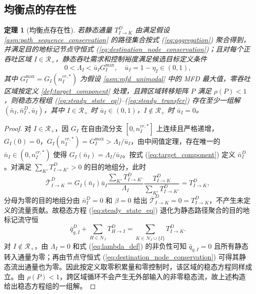 \documentclass[a4paper,12pt]{article}
\theoremstyle{plain}
\newtheorem{theorem}{定理}[section]
\theoremstyle{definition}
\theoremstyle{remark}
\begin{document}
\subsection{均衡点的存在性}

\begin{theorem}[均衡点存在性]\label{thm:equilibrium_existence}
若静态通量 $T_{I\to K}^D$ 由满足假设 \ref{asm:path_sequence_conservation} 的路径集合按式 (\ref{eq:aggregation}) 聚合得到，并满足目的地标记节点守恒式 (\ref{eq:destination_node_conservation})；且对每个正吞吐区域 $I \in \mathcal{R}_+$，静态吞吐需求和控制裕度满足候选目标定义条件
\begin{equation}\label{eq:margin_feasibility}
    0<\Lambda_I < \bar u_I G_I^{\max},
    \quad \bar u_I=1-\eta_I\in(0,1),
\end{equation}
其中 $G_I^{\max} = G_I(n_I^{cr,*})$ 为假设 \ref{asm:mfd_unimodal} 中的 MFD 最大值，零吞吐区域按定义 \ref{def:target_component} 处理，且跨区域转移矩阵 $P$ 满足 $\rho(P)<1$，则稳态方程组 (\ref{eq:steady_state_eq})--(\ref{eq:steady_transfer}) 存在至少一组解 $(\bar{n}_I, \bar{n}_I^D, \bar{u}_I)$，其中 $I\in\mathcal R_+$ 时 $\bar{u}_I \in (0,1)$，$I\notin\mathcal R_+$ 时 $\bar u_I=0$。
\end{theorem}

\begin{proof}
对 $I\in\mathcal R_+$，因 $G_I$ 在自由流分支 $[0, n_I^{cr,*}]$ 上连续且严格递增，$G_I(0)=0$，$G_I(n_I^{cr,*})=G_I^{\max}>\Lambda_I/\bar u_I$，由中间值定理，存在唯一的 $\bar n_I\in(0,n_I^{cr,*})$ 使得 $G_I(\bar n_I)=\Lambda_I/\bar u_I$。按式 (\ref{eq:target_component}) 定义 $\bar n_I^D$。对满足 $\sum_{K'}T_{I\to K'}^D>0$ 的目的地组分，此时
\begin{equation}
    \bar{\mathcal T}_{I\to K}^D
    =
    G_I(\bar n_I)\bar u_I
    \frac{\sum_{K'}T_{I\to K'}^D}{\Lambda_I}
    \frac{T_{I\to K}^D}{\sum_{K'}T_{I\to K'}^D}
    =
    T_{I\to K}^D ,
\end{equation}
分母为零的目的地组分由 $\bar n_I^D=0$ 和 $\beta=0$ 给出 $\bar{\mathcal T}_{I\to K}^D=0=T_{I\to K}^D$，不产生未定义的流量贡献。故稳态方程 (\ref{eq:steady_state_eq}) 退化为静态路径聚合的目的地标记流守恒
\begin{equation}
    \bar q_{g,I}^D+\sum_{H\in\mathcal N_I}T_{H\to I}^D
    =
    \sum_{K\in\mathcal N_I\cup\{I\}}T_{I\to K}^D .
\end{equation}
对 $I\notin\mathcal R_+$，由 $\Lambda_I=0$ 和式 (\ref{eq:lambda_def}) 的非负性可知 $\bar q_{g,I}=0$ 且所有静态转入通量为零；再由节点守恒式 (\ref{eq:destination_node_conservation}) 可得其静态流出通量也为零。因此按定义取零积累量和零控制时，该区域的稳态方程同样成立。由 $\rho(P)<1$，跨区域循环不会产生无外部输入的非零稳态流，故上述构造给出稳态方程组的一组解。
\end{proof}
\end{document}
